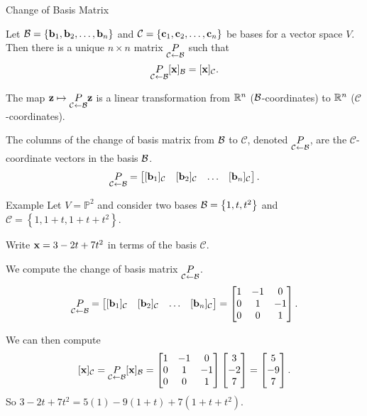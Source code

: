 \documentclass[xcolor=dvipsnames,aspectratio=169,t]{beamer}
\renewcommand{\C}{\mathcal{C}}
\begin{document}
\begin{frame}{Change of Basis Matrix}
  \medskip

  \begin{theorem}
    Let $\mathcal{B} = \left\{ \mathbf{b}_1,\mathbf{b}_2,\ldots,\mathbf{b}_n \right\}$ and $\C = \left\{ \c_1,\c_2,\ldots,\c_n \right\}$ be bases for a vector space $V$.
    Then there is a unique $n \times n$ matrix $\underset{\C \leftarrow \B}{P}$ such that
    \[ \underset{\C \leftarrow \B}{P} [\x]_\B = [\x]_\C. \]
    
    The map $\z \mapsto \underset{\C \leftarrow \B}{P} \z$ is a linear transformation from $\mathbb{R}^n$ ($\mathcal{B}$-coordinates) to $\mathbb{R}^n$ ($\C$-coordinates).
    \bigskip

    The columns of the \alert{change of basis matrix from $\mathcal{B}$ to $\C$}, denoted \alert{$\underset{\C \leftarrow \B}{P}$}, are the $\C$-coordinate vectors in the basis $\mathcal{B}$.
    \[ \underset{\C \leftarrow \B}{P} =
      \begin{bmatrix} [\b_1]_{\C} & [\b_2]_{\C} & \ldots & [\b_n]_{\C} \end{bmatrix}.
    \]
  \end{theorem}
\end{frame}


\begin{frame}{Example}
  Let $V = \mathbb{P}^2$ and consider two bases
  $\mathcal{B} = \left\{ 1, t, t^2 \right\}$ and $\C = \left\{ 1, 1+t, 1+t+t^2 \right\}$.

  Write $\mathbf{x}=3-2t+7t^2$ in terms of the basis $\C$.
  \medskip

  \pause
  We compute the change of basis matrix $\underset{\C \leftarrow \B}P$.
  \[
    \underset{\C \leftarrow \B}P=
    \begin{bmatrix} [\b_1]_{\C} & [\b_2]_{\C} & \ldots & [\b_n]_{\C} \end{bmatrix}
    =
    \begin{bmatrix} 1 & -1 & 0 \\ 0 & 1 & -1 \\ 0 & 0 & 1 \end{bmatrix}.
  \]
  
  \pause
  We can then compute
  \[
    [\x]_\C = \underset{\C \leftarrow \B}P [\x]_\B
    = \begin{bmatrix} 1 & -1 & 0 \\ 0 & 1 & -1 \\ 0 & 0 & 1 \end{bmatrix}
    \begin{bmatrix} 3 \\ -2 \\ 7 \end{bmatrix}
    =
    \begin{bmatrix} 5 \\ -9 \\ 7 \end{bmatrix}.
  \]
  So $3-2t+7t^2 = 5 (1) -9 (1+t) +7 (1+t+t^2)$.
\end{frame}
\end{document}
